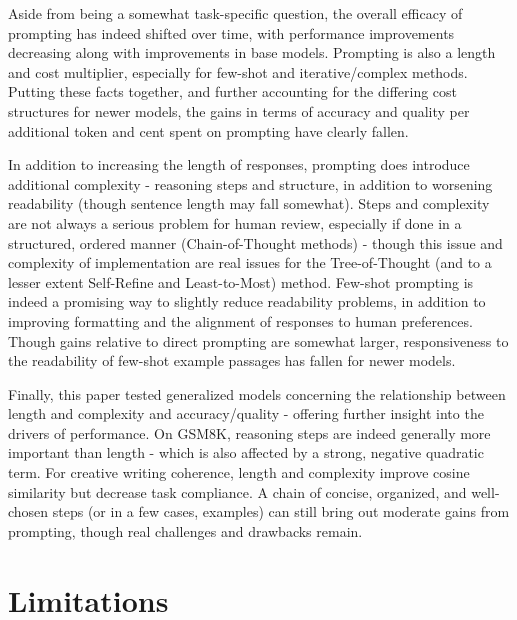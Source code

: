 \documentclass[11pt]{article}
\begin{document}
Aside from being a somewhat task-specific question, the overall efficacy of prompting has indeed shifted over time, with performance improvements decreasing along with improvements in base models. Prompting is also a length and cost multiplier, especially for few-shot and iterative/complex methods. Putting these facts together, and further accounting for the differing cost structures for newer models, the gains in terms of accuracy and quality per additional token and cent spent on prompting have clearly fallen.

In addition to increasing the length of responses, prompting does introduce additional complexity - reasoning steps and structure, in addition to worsening readability (though sentence length may fall somewhat). Steps and complexity are not always a serious problem for human review, especially if done in a structured, ordered manner (Chain-of-Thought methods) - though this issue and complexity of implementation are real issues for the Tree-of-Thought (and to a lesser extent Self-Refine and Least-to-Most) method. Few-shot prompting is indeed a promising way to slightly reduce readability problems, in addition to improving formatting and the alignment of responses to human preferences. Though gains relative to direct prompting are somewhat larger, responsiveness to the readability of few-shot example passages has fallen for newer models.

Finally, this paper tested generalized models concerning the relationship between length and complexity and accuracy/quality - offering further insight into the drivers of performance. On GSM8K, reasoning steps are indeed generally more important than length - which is also affected by a strong, negative quadratic term. For creative writing coherence, length and complexity improve cosine similarity but decrease task compliance. A chain of concise, organized, and well-chosen steps (or in a few cases, examples) can still bring out moderate gains from prompting, though real challenges and drawbacks remain.



\section*{Limitations}
\end{document}
